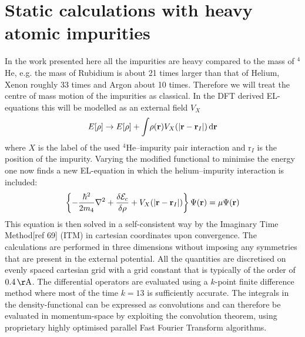 \documentclass[12pt,a4paper]{book}
\renewcommand{\vec}[1]{\bm{\mathrm{#1}}}
\newcommand{\unit}[1]{\,\mathrm{#1}}
\newcommand{\diff}[1]{\,\mathrm{d}{\vec{#1}}}
\begin{document}
		\clearpage			
		\section{Static calculations with heavy atomic impurities}
			In the work presented here all the impurities are heavy compared to the mass of $^4$He, e.g. the mass of Rubidium is about 21 times larger than that of Helium, Xenon roughly 33 times and Argon about 10 times. Therefore we will treat the centre of mass motion of the impurities as classical. In the DFT derived EL-equations this will be modelled as an external field $V_X$
			\begin{align}
				E[\rho] \rightarrow E[\rho] +  \int\!\rho({\mathbf r}) V_X\qty(\abs{{\mathbf r} - {\mathbf r}_I})\diff{r} \label{eq:el-static-hi}
			\end{align}
			where $X$ is the label of the used $^4$He--impurity pair interaction and ${\vec r}_I$ is the position of the impurity. Varying the modified functional to minimise the energy one now finds a new EL-equation in which the helium--impurity interaction is included:
			\begin{align}
				\left\{-\frac{\hbar^2}{2m_4} \laplacian + \fdv{\mathcal{E}_c}{\rho} + V_X(|{\mathbf r} - {\mathbf r_I}|)\right\}\Psi({\mathbf r}) = \mu \Psi({\mathbf r}) \label{eq:el-static-hi}
			\end{align}
			This equation is then solved in a self-consistent way by the Imaginary Time Method[ref 69] (ITM) in cartesian coordinates upon convergence. The calculations are performed in three dimensions without imposing any symmetries that are present in the external potential. All the quantities are discretised on evenly spaced cartesian grid with a grid constant that is typically of the order of $0.4\unit{\AA}$. The differential operators are evaluated using a $k$-point finite difference method where most of the time $k=13$ is sufficiently accurate. The integrals in the density-functional can be expressed as convolutions and can therefore be evaluated in momentum-space by exploiting the convolution theorem, using proprietary highly optimised parallel Fast Fourier Transform algorithms. 
			
\end{document}
